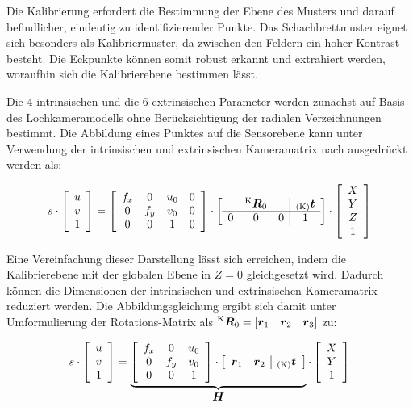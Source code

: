 Die Kalibrierung erfordert die Bestimmung der Ebene des Musters und darauf befindlicher, eindeutig zu identifizierender Punkte. Das Schachbrettmuster eignet sich besonders als Kalibriermuster, da zwischen den Feldern ein hoher Kontrast besteht. Die Eckpunkte können somit robust erkannt und extrahiert werden, woraufhin sich die Kalibrierebene bestimmen lässt.\\

\prever{
}

Die 4 intrinsischen und die 6 extrinsischen Parameter werden zunächst auf Basis des Lochkameramodells ohne Berücksichtigung der radialen Verzeichnungen bestimmt. Die Abbildung eines Punktes auf die Sensorebene kann unter Verwendung der intrinsischen und extrinsischen Kameramatrix nach  ausgedrückt werden als:

\begin{equation}
s \cdot 
\mat{c}{
u\\
v\\
1
}
=
\mat{cccc}{
f_x & 0 & u_\ind{0} & 0\\
0 & f_y & v_\ind{0} & 0\\
0 & 0 & 1 & 0
}
\cdot
\mat{ccc|c}{
  & \rmat{K}{0} &   & \ve{K}{t} \\
\hline
0 &      0      & 0 & 1 \\
}
\cdot
\mat{c}{
X\\
Y\\
Z\\
1
}
\end{equation}

Eine Vereinfachung dieser Darstellung lässt sich erreichen, indem die Kalibrierebene mit der globalen Ebene in $Z=0$ gleichgesetzt wird. Dadurch können die Dimensionen der intrinsischen und extrinsischen Kameramatrix reduziert werden. Die Abbildungsgleichung ergibt sich damit unter Umformulierung der Rotations-Matrix als $\rmat{K}{0} = [\vec{r}_1 \quad \vec{r}_2 \quad \vec{r}_3]$ zu:


\begin{equation}
s \cdot
\mat{c}{
u\\
v\\
1
}
 = 
\underbrace{
\mat{ccc}{ 
	f_x & 0 & u_\ind{0}\\
	0 & f_y & v_\ind{0}\\
	0 & 0 & 1
}
\cdot
\mat{cc|c}{ 
	\vec{r}_1 & \vec{r}_2 & \ve{K}{t} \\
}
}_{\vec{H}}
\cdot
\mat{c}{
	X\\
	Y\\
	1
}
\end{equation}

